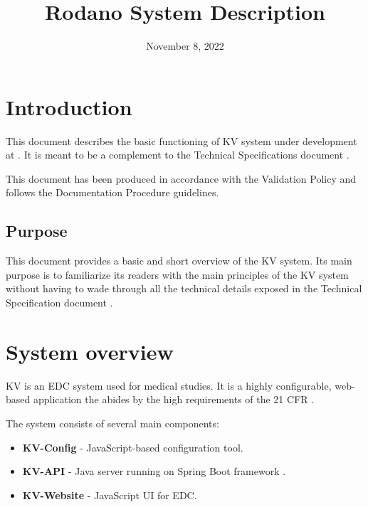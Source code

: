 \documentclass[11pt,a4paper,oneside]{article}
\begin{document}
\title{Rodano System Description}
\newcommand{\documentid}{SystemDescription}
\newcommand{\version}{1.1.0-draft}
\date{November 8, 2022}



\clearpage

\tableofcontents

\clearpage

\section{Introduction}
This document describes the basic functioning of KV system under development at \rodanotech{}. It is meant to be a complement to the Technical Specifications document \cite{IT-0201-KV-TechnicalSpecifications}.

This document has been produced in accordance with the Validation Policy \cite{IT-0700-ValidationPolicy} and follows the Documentation Procedure \cite{IT-0000-DocumentationProcedure} guidelines.

\subsection{Purpose}
This document provides a basic and short overview of the KV system. Its main purpose is to familiarize its readers with the main principles of the KV system without having to wade through all the technical details exposed in the Technical Specification document \cite{IT-0201-KV-TechnicalSpecifications}.

\section{System overview}
KV is an EDC system used for medical studies. It is a highly configurable, web-based application the abides by the high requirements of the 21 CFR \cite{IT-0204-System-21CFRCompliance}.

The system consists of several main components:

\begin{itemize}
	\item \textbf{KV-Config} - JavaScript-based \cite{JavaScript} configuration tool.
	\item \textbf{KV-API} - Java \cite{Java} server running on Spring Boot framework \cite{SpringBoot}.
	\item \textbf{KV-Website} - JavaScript \cite{JavaScript} UI for EDC.
\end{itemize}
\end{document}
